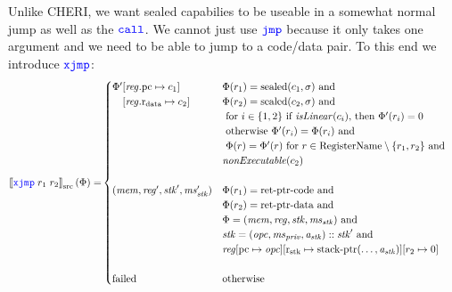 \documentclass[a4paper]{article}
\newcommand{\sem}[1]{\left\llbracket #1 \right\rrbracket}
\newcommand{\ssem}[2][\Phi]{\sem{#2}_{\mathrm{src}}(#1)}
\newcommand{\sourcecolor}{\color{blue}}
\newcommand{\src}[1]{{\sourcecolor #1}}
\newcommand{\zinstr}[1]{\texttt{#1}}
\newcommand{\oneinstr}[2]{
  \ifthenelse{\equal{#2}{}}
  {\zinstr{#1}}
  {\zinstr{#1} \; #2}
}
\newcommand{\twoinstr}[3]{
  \ifthenelse{\equal{#2#3}{}}
  {\zinstr{#1}}
  {\zinstr{#1} \; #2 \; #3}
}
\newcommand{\sjmp}[1]{\oneinstr{\src{jmp}}{#1}}
\newcommand{\scall}[2]{\twoinstr{\src{call}}{#1}{#2}}
\newcommand{\sxjmp}[2]{\twoinstr{\src{xjmp}}{#1}{#2}}
\newcommand{\update}[2]{[#1 \mapsto #2]}
\newcommand{\shareddom}[1]{\mathrm{#1}}
\newcommand{\stkptr}[1]{\mathrm{stack\text{-}ptr}(#1)}
\newcommand{\retptrd}{\mathrm{ret\text{-}ptr\text{-}data}}
\newcommand{\retptrc}{\mathrm{ret\text{-}ptr\text{-}code}}
\newcommand{\sealed}[1]{\shareddom{sealed}(#1)}
\newcommand{\failed}{\mathrm{failed}}
\newcommand{\targetdom}[1]{\mathrm{#1}}
\newcommand{\tRegName}{\targetdom{RegisterName}}
\newcommand{\var}[1]{\mathit{#1}}
\newcommand{\reg}{\var{reg}}
\newcommand{\mem}{\var{mem}}
\newcommand{\ms}{\var{ms}}
\newcommand{\stk}{\var{stk}}
\newcommand{\priv}{\var{priv}}
\newcommand{\opc}{\var{opc}}
\newcommand{\aaddr}{\var{a}}
\newcommand{\pcreg}{\mathrm{pc}}
\newcommand{\rstk}{\mathrm{r}_\mathrm{stk}}
\newcommand{\rdata}{\mathrm{r}_\mathrm{data}}
\newcommand{\plainfun}[2]{
  \ifthenelse{\equal{#2}{}}
  {\mathit{#1}}
  {\mathit{#1}(#2)}
}
\newcommand{\nonExec}[1]{\plainfun{nonExecutable}{#1}}
\newcommand{\isLinear}[1]{\plainfun{isLinear}{#1}}
\begin{document}
Unlike CHERI, we want sealed capabilies to be useable in a somewhat normal jump as well as the $\scall{}{}$. We cannot just use $\sjmp{}$ because it only takes one argument and we need to be able to jump to a code/data pair. To this end we introduce $\sxjmp{}{}$:
\begin{align*}
  \ssem{\sxjmp{r_1}{r_2}} = & 
                              \begin{cases}
                                \Phi'
                                \arraycolsep=0pt
                                \begin{array}[t]{l}
                                  [\reg.\pcreg \mapsto c_1] \\
                                  [\reg.\rdata \mapsto c_2]
                                \end{array} & 
                                \arraycolsep=0pt
                                \begin{array}[t]{l}
                                  \Phi(r_1) = \sealed{c_1,\sigma} \text{ and } \\
                                  \Phi(r_2) = \sealed{c_2,\sigma} \text{ and } \\
                                  \text{ for $i \in \{1,2\}$ if $\isLinear{c_i}$, then $\Phi'(r_i) = 0$} \\
                                  \text{ otherwise $\Phi'(r_i) = \Phi(r_i)$ and} \\
                                  \text{ $ \Phi(r) = \Phi'(r) \text{ for } r\in \tRegName \setminus \{r_1,r_2\}$ and} \\
                                  \nonExec{c_2}
                                \end{array}\\\\
%
                                (\mem,\reg',\stk',\ms_\stk') &
                                \arraycolsep=0pt
                                \begin{array}[t]{l}
                                  \Phi(r_1) = \retptrc \text{ and } \\
                                  \Phi(r_2) = \retptrd \text{ and } \\
                                  \Phi = (\mem, \reg, \stk, \ms_\stk) \text{ and } \\
                                  \stk = (\opc,\ms_\priv,\aaddr_\stk) :: \stk' \text{ and } \\
                                  \reg \arraycolsep=0pt
                                  \begin{array}[t]{l}
                                    \update{\pcreg}{\opc}\update{\rstk}{\stkptr{\dots,\aaddr_\stk}}\update{r_2}{0}\\
                                  \end{array}
                                \end{array}\\\\
%
                                \failed & \text{otherwise}
                              \end{cases}
\end{align*}
\end{document}
